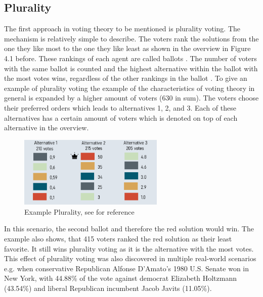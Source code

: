 \documentclass[german, a4paper, 11pt, oneside]{scrbook}
\begin{document}
\subsection{Plurality}
The first approach in voting theory to be mentioned is plurality voting. The mechanism is relatively simple to describe. The voters rank the solutions from the one they like most to the one they like least as shown in the overview in Figure 4.1 before. These rankings of each agent are called ballots \cite{Brandt}. The number of voters with the same ballot is counted and the highest alternative within the ballot with the most votes wins, regardless of the other rankings in the ballot \cite{Brandt}. To give an example of plurality voting the example of the characteristics of voting theory in general is expanded by a higher amount of voters (630 in sum). The voters choose their preferred orders which leads to alternatives 1, 2, and 3. Each of these alternatives has a certain amount of voters which is denoted on top of each alternative in the overview.
\begin{figure}[h]
\centering
\includegraphics[height=3.4cm]{Plurality}
\caption{Example Plurality, see\cite{Brandt} for reference}
\end{figure}
In this scenario, the second ballot and therefore the red solution would win. The example also shows, that 415 voters ranked the red solution as their least favorite. It still wins plurality voting as it is the alternative with the most votes.
\\
This effect of plurality voting was also discovered in multiple real-world scenarios e.g. when conservative Republican Alfonse D’Amato’s 1980 U.S. Senate won in New York, with 44.88\% of the vote against democrat Elizabeth Holtzmann (43.54\%) and liberal Republican incumbent Jacob Javits (11.05\%).\cite{Brandt}
\end{document}
